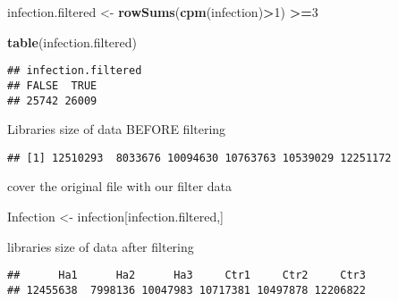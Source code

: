 \documentclass[
]{article}
\newenvironment{Shaded}{\begin{snugshade}}{\end{snugshade}}
\newcommand{\DecValTok}[1]{\textcolor[rgb]{0.00,0.00,0.81}{#1}}
\newcommand{\FunctionTok}[1]{\textcolor[rgb]{0.13,0.29,0.53}{\textbf{#1}}}
\newcommand{\NormalTok}[1]{#1}
\newcommand{\OtherTok}[1]{\textcolor[rgb]{0.56,0.35,0.01}{#1}}
\newcommand{\SpecialCharTok}[1]{\textcolor[rgb]{0.81,0.36,0.00}{\textbf{#1}}}
\begin{document}
\begin{Shaded}
\begin{Highlighting}[]
\NormalTok{infection.filtered }\OtherTok{\textless{}{-}} \FunctionTok{rowSums}\NormalTok{(}\FunctionTok{cpm}\NormalTok{(infection)}\SpecialCharTok{\textgreater{}}\DecValTok{1}\NormalTok{) }\SpecialCharTok{\textgreater{}=}\DecValTok{3}
\end{Highlighting}
\end{Shaded}

\begin{Shaded}
\begin{Highlighting}[]
\FunctionTok{table}\NormalTok{(infection.filtered)}
\end{Highlighting}
\end{Shaded}

\begin{verbatim}
## infection.filtered
## FALSE  TRUE 
## 25742 26009
\end{verbatim}

Libraries size of data BEFORE filtering

\begin{Shaded}
\end{Shaded}

\begin{verbatim}
## [1] 12510293  8033676 10094630 10763763 10539029 12251172
\end{verbatim}

cover the original file with our filter data

\begin{Shaded}
\begin{Highlighting}[]
\NormalTok{Infection }\OtherTok{\textless{}{-}}\NormalTok{ infection[infection.filtered,]}
\end{Highlighting}
\end{Shaded}

libraries size of data after filtering

\begin{Shaded}
\end{Shaded}

\begin{verbatim}
##      Ha1      Ha2      Ha3     Ctr1     Ctr2     Ctr3 
## 12455638  7998136 10047983 10717381 10497878 12206822
\end{verbatim}
\end{document}
